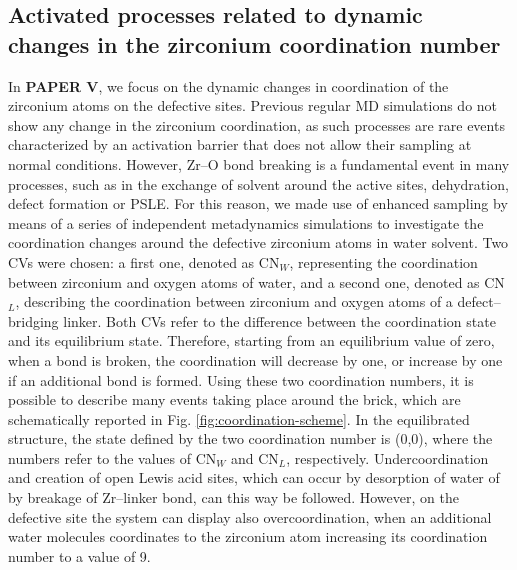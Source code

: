 \subsection{Activated processes related to dynamic changes in the zirconium coordination number}
In \textbf{PAPER V}, we focus on the dynamic changes in coordination of the zirconium atoms on the defective sites. Previous regular MD simulations do not show any change in the zirconium coordination, as such processes are rare events characterized by an activation barrier that does not allow their sampling at normal conditions. However, Zr--O bond breaking is a fundamental event in many processes, such as in the exchange of solvent around the active sites, dehydration, defect formation or PSLE. For this reason, we made use of enhanced sampling by means of a series of independent metadynamics simulations to investigate the coordination changes around the defective zirconium atoms in water solvent. Two CVs were chosen: a first one, denoted as CN$_W$, representing the coordination between zirconium and oxygen atoms of water, and a second one, denoted as CN$_L$, describing the coordination between zirconium and oxygen atoms of a defect--bridging linker. Both CVs refer to the difference between the coordination state and its equilibrium state. Therefore, starting from an equilibrium value of zero, when a bond is broken, the coordination will decrease by one, or increase by one if an additional bond is formed. Using these two coordination numbers, it is possible to describe many events taking place around the brick, which are schematically reported in Fig. \ref{fig:coordination-scheme}. In the equilibrated structure, the state defined by the two coordination number is (0,0), where the numbers refer to the values of CN$_W$ and CN$_L$, respectively. Undercoordination and creation of open Lewis acid sites, which can occur by desorption of water of by breakage of Zr--linker bond, can this way be followed. However, on the defective site the system can display also overcoordination, when an additional water molecules coordinates to the zirconium atom increasing its coordination number to a value of 9. 

